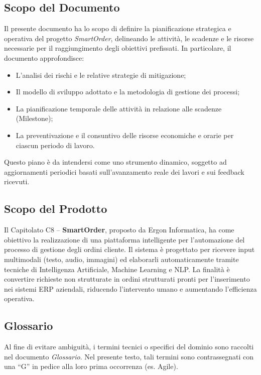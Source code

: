 \documentclass[a4paper, 11pt, oneside]{scrartcl} %
\begin{document}
\subsection{Scopo del Documento}
Il presente documento ha lo scopo di definire la pianificazione strategica e operativa del progetto \textit{SmartOrder}, delineando le attività, le scadenze e le risorse necessarie per il raggiungimento degli obiettivi prefissati. 
In particolare, il documento approfondisce:
\begin{itemize}
    \item L'analisi dei rischi e le relative strategie di mitigazione{\scriptsize{}};
    \item Il modello di sviluppo adottato{\scriptsize{}} e la metodologia di gestione dei processi;
    \item La pianificazione temporale delle attività in relazione alle scadenze (Milestone{\scriptsize{}});
    \item La preventivazione e il consuntivo{\scriptsize{}} delle risorse economiche e orarie per ciascun periodo di lavoro.
\end{itemize}
Questo piano è da intendersi come uno strumento dinamico, soggetto ad aggiornamenti periodici basati sull'avanzamento reale dei lavori e sui feedback ricevuti.

\subsection{Scopo del Prodotto}
Il Capitolato{\scriptsize{}} C8 – \textbf{SmartOrder}, proposto da Ergon Informatica, ha come obiettivo la realizzazione di una piattaforma intelligente per l’automazione del processo di gestione degli ordini cliente.
Il sistema è progettato per ricevere input multimodali (testo, audio, immagini) ed elaborarli automaticamente tramite tecniche di Intelligenza Artificiale{\scriptsize{}}, Machine Learning{\scriptsize{}} e NLP{\scriptsize{}}.
La finalità è convertire richieste non strutturate in ordini strutturati pronti per l'inserimento nei sistemi ERP{\scriptsize{}} aziendali, riducendo l'intervento umano e aumentando l'efficienza operativa.

\subsection{Glossario}
Al fine di evitare ambiguità, i termini tecnici o specifici del dominio sono raccolti nel documento \textit{Glossario}. Nel presente testo, tali termini sono contrassegnati con una “G” in pedice alla loro prima occorrenza (es. Agile{\scriptsize{}}).
\end{document}
